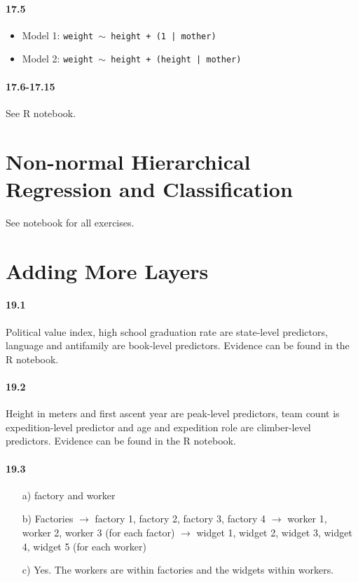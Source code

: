 \documentclass[fontsize=11pt,DIV=18,parskip=half]{scrartcl}
\begin{document}
\paragraph{17.5}
\begin{itemize}
\item Model 1: \texttt{weight $\sim$ height + (1 | mother)}
\item Model 2: \texttt{weight $\sim$ height + (height | mother)}
\end{itemize}

\paragraph{17.6-17.15} See R notebook.

\section{Non-normal Hierarchical Regression and Classification}

See notebook for all exercises.

\section{Adding More Layers}

\paragraph{19.1}
Political value index, high school graduation rate are state-level predictors, language and antifamily are book-level predictors. Evidence can be found in the R notebook.

\paragraph{19.2} Height in meters and first ascent year are peak-level predictors, team count is expedition-level predictor and age and expedition role are climber-level predictors. Evidence can be found in the R notebook.

\paragraph{19.3}
\begin{itemize}
\item[a)] factory and worker
\item[b)] Factories $\to$ factory 1, factory 2, factory 3, factory 4 $\to$ worker 1, worker 2, worker 3 (for each factor) $\to$ widget 1, widget 2, widget 3, widget 4, widget 5 (for each worker)
\item[c)] Yes. The workers are within factories and the widgets within workers.
\end{itemize}
\end{document}
